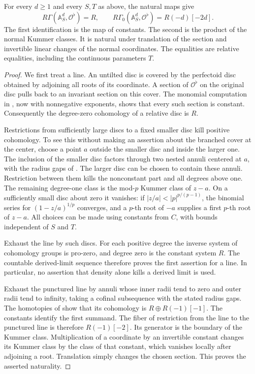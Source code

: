 \begin{lemma}\label{h3:ana:affine-purity}
For every $d\geq1$ and every $S,T$ as above, the natural maps give
\[
 R\Gamma(\mathbb A^d_S,\mathcal O^\flat)=R,
 \qquad
 R\Gamma_{0}(\mathbb A^d_S,\mathcal O^\flat)
   =R(-d)[-2d].
\]
The first identification is the map of constants.  The second is
the product of the normal Kummer classes.  It is natural under
translation of the section and invertible linear changes of the
normal coordinates.  The equalities are relative equalities,
including the continuous parameters $T$.
\end{lemma}
\begin{proof}
We first treat a line.  An untilted disc is covered by the
perfectoid disc obtained by adjoining all roots of its coordinate.
A section of $\mathcal O^\flat$ on the original disc pulls back to
an invariant section on this cover.  The monomial computation in
, now with nonnegative exponents,
shows that every such section is constant.  Consequently the
degree-zero cohomology of a relative disc is $R$.

Restrictions from sufficiently large discs to a fixed smaller disc
kill positive cohomology.  To see this without making an assertion
about the branched cover at the center, choose a point $a$ outside
the smaller disc and inside the larger one.  The inclusion of the
smaller disc factors through two nested annuli centered at $a$,
with the radius gaps of .  The larger
disc can be chosen to contain these annuli.  Restriction between
them kills the nonconstant part and all degrees above one.
The remaining degree-one class is the mod-$p$ Kummer class of
$z-a$.  On a sufficiently small disc about zero it vanishes:
if $|z/a|<|p|^{p/(p-1)}$, the binomial series for
$(1-z/a)^{1/p}$ converges, and a $p$-th root of $-a$ supplies
a first $p$-th root of $z-a$.  All choices can be made using
constants from $C$, with bounds independent of $S$ and $T$.

Exhaust the line by such discs.  For each positive degree the
inverse system of cohomology groups is pro-zero, and degree zero
is the constant system $R$.  The countable derived-limit sequence
therefore proves the first assertion for a line.  In particular,
no assertion that density alone kills a derived limit is used.

Exhaust the punctured line by annuli whose inner radii tend to zero
and outer radii tend to infinity, taking a cofinal subsequence with
the stated radius gaps.  The homotopies of
 show that its cohomology is
$R\oplus R(-1)[-1]$.  The constants identify the first summand.
The fiber of restriction from the line to the punctured line is
therefore $R(-1)[-2]$.  Its generator is the boundary of the
Kummer class.  Multiplication of a coordinate by an invertible
constant changes its Kummer class by the class of that constant,
which vanishes locally after adjoining a root.  Translation simply
changes the chosen section.  This proves the asserted naturality.


\end{proof}
